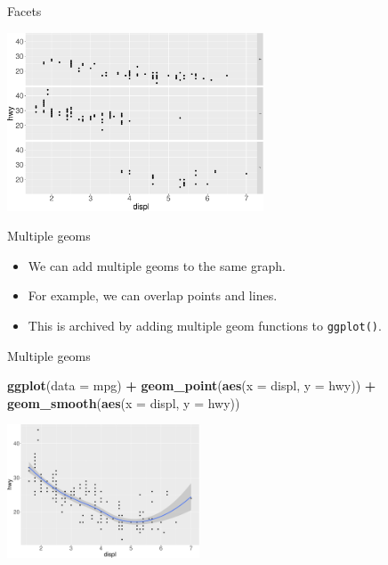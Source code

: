 \documentclass[ignorenonframetext,]{beamer}
\newenvironment{Shaded}{\begin{snugshade}}{\end{snugshade}}
\newcommand{\DataTypeTok}[1]{\textcolor[rgb]{0.13,0.29,0.53}{#1}}
\newcommand{\KeywordTok}[1]{\textcolor[rgb]{0.13,0.29,0.53}{\textbf{#1}}}
\newcommand{\NormalTok}[1]{#1}
\newcommand{\OperatorTok}[1]{\textcolor[rgb]{0.81,0.36,0.00}{\textbf{#1}}}
\newcommand{\StringTok}[1]{\textcolor[rgb]{0.31,0.60,0.02}{#1}}
\begin{document}
\begin{frame}{Facets}
\protect\hypertarget{facets-10}{}

\begin{center}\includegraphics[height=200px]{data-visualization_files/figure-beamer/unnamed-chunk-79-1} \end{center}

\end{frame}

\begin{frame}[fragile]{Multiple geoms}
\protect\hypertarget{multiple-geoms}{}

\begin{itemize}
\item
  We can add multiple geoms to the same graph.
\item
  For example, we can overlap points and lines.
\item
  This is archived by adding multiple geom functions to
  \texttt{ggplot()}.
\end{itemize}

\end{frame}

\begin{frame}[fragile]{Multiple geoms}
\protect\hypertarget{multiple-geoms-1}{}

\begin{Shaded}
\begin{Highlighting}[]
\KeywordTok{ggplot}\NormalTok{(}\DataTypeTok{data =}\NormalTok{ mpg) }\OperatorTok{+}\StringTok{ }
\StringTok{  }\KeywordTok{geom_point}\NormalTok{(}\KeywordTok{aes}\NormalTok{(}\DataTypeTok{x =}\NormalTok{ displ, }\DataTypeTok{y =}\NormalTok{ hwy)) }\OperatorTok{+}
\StringTok{  }\KeywordTok{geom_smooth}\NormalTok{(}\KeywordTok{aes}\NormalTok{(}\DataTypeTok{x =}\NormalTok{ displ, }\DataTypeTok{y =}\NormalTok{ hwy))}
\end{Highlighting}
\end{Shaded}

\begin{center}\includegraphics[height=150px]{data-visualization_files/figure-beamer/unnamed-chunk-80-1} \end{center}

\end{frame}
\end{document}
